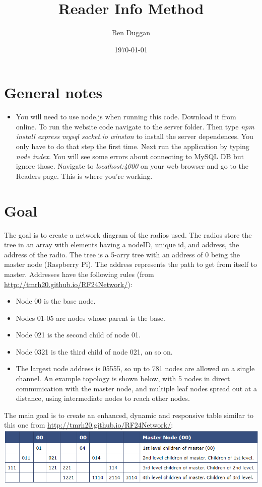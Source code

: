 \documentclass[12pt]{article}
\begin{document}
\title{\vspace{-3cm}Reader Info Method}
\author{Ben Duggan}
\date{\today}
\maketitle

\section{General notes}
\begin{itemize}
	\item You will need to use node.js when running this code.  Download it from online. To run the website code navigate to the server folder.  Then type \textit{npm install express mysql socket.io winston} to install the server dependences.  You only have to do that step the first time.  Next run the application by typing \textit{node index}.  You will see some errors about connecting to MySQL DB but ignore those.  Navigate to \textit{localhost:4000} on your web browser and go to the Readers page.  This is where you're working.
\end{itemize}

\section{Goal}
The goal is to create a network diagram of the radios used.  The radios store the tree in an array with elements having a nodeID, unique id, and address, the address of the radio.  The tree is a 5-arry tree with an address of 0 being the master node (Raspberry Pi).  The address represents the path to get from itself to master.  Addresses have the following rules (from \url{http://tmrh20.github.io/RF24Network/}):
\begin{itemize}
	\item Node 00 is the base node.
	\item Nodes 01-05 are nodes whose parent is the base.
	\item Node 021 is the second child of node 01.
	\item Node 0321 is the third child of node 021, an so on.
	\item The largest node address is 05555, so up to 781 nodes are allowed on a single channel. An example topology is shown below, with 5 nodes in direct communication with the master node, and multiple leaf nodes spread out at a distance, using intermediate nodes to reach other nodes.
\end{itemize}
The main goal is to create an enhanced, dynamic and responsive table similar to this one from \url{http://tmrh20.github.io/RF24Network/}:\\
\includegraphics[width=6in]{example_table}\\
\end{document}
